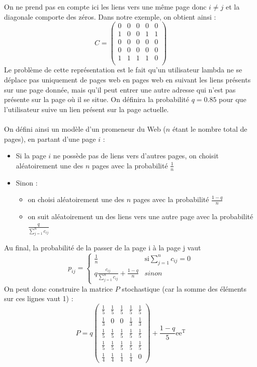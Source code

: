         On ne prend pas en compte ici les liens vers une même page donc $i\neq j$ et la diagonale comporte des zéros. Dans notre exemple, on obtient ainsi : 
        $$
        C=\begin{pmatrix}
            0&0&0&0&0\\
            1&0&0&1&1\\
            0&0&0&0&0\\
            0&0&0&0&0\\
            1&1&1&1&0\\
        \end{pmatrix}$$
        Le problème de cette représentation est le fait qu'un utilisateur lambda ne se déplace pas uniquement de pages web en pages web en suivant les liens présents sur une page donnée, mais qu'il peut entrer une autre adresse qui n'est pas présente sur la page où il se situe. On définira la probabilité $q = 0.85$ pour que l'utilisateur suive un lien présent sur la page actuelle.\\\\On défini ainsi un modèle d'un promeneur du Web ($n$ étant le nombre total de pages), en partant d'une page $i$ :
        \begin{itemize}
        \item Si la page $i$ ne possède pas de liens vers d'autres pages, on choisit aléatoirement une des $n$ pages avec la probabilité $\frac{1}{n}$
        \item Sinon : \begin{itemize}[label=\textbullet]
            \item on choisi aléatoirement une des $n$ pages avec la probabilité $\frac{1-q}{n}$
            \item on suit aléatoirement un des liens vers une autre page avec la probabilité $\frac{q}{\sum^n_{j=1}c_{ij}}$
        \end{itemize}
        \end{itemize}
        Au final, la probabilité de la passer de la page i à la page j vaut $$
        p_{ij} = \begin{cases}
            \frac{1}{n}&\text{si} \sum^n_{j=1}c_{ij}=0\\
            q\frac{c_{ij}}{\sum^n_{j=1}c_{ij}}+\frac{1-q}{n}&sinon
        \end{cases}
        $$
        On peut donc construire la matrice $P$ stochastique (car la somme des éléments sur ces lignes vaut 1) : 
        $$
        \renewcommand{\arraystretch}{1.5}
        P=q \begin{pmatrix}
            \frac{1}{5}&\frac{1}{5}&\frac{1}{5}&\frac{1}{5}&\frac{1}{5}\\
            \frac{1}{3}&0&0&\frac{1}{3}&\frac{1}{3}\\
            \frac{1}{5}&\frac{1}{5}&\frac{1}{5}&\frac{1}{5}&\frac{1}{5}\\
            \frac{1}{5}&\frac{1}{5}&\frac{1}{5}&\frac{1}{5}&\frac{1}{5}\\
            \frac{1}{4}&\frac{1}{4}&\frac{1}{4}&\frac{1}{4}&0
        \end{pmatrix}+\frac{1-q}{5}\text{e}\text{e}^\text{T}
        $$
